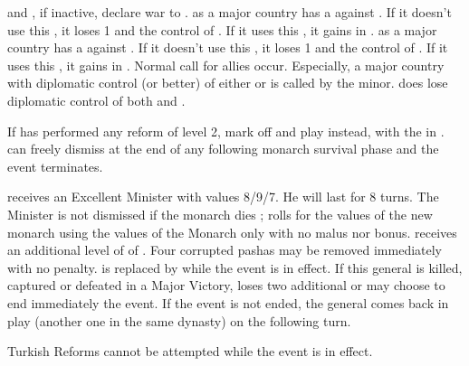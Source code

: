 

\phevnt
\aparag \DANMin and \PRUmin, if inactive, declare war to \SUE.
\aparag \PRU as a major country has a \CB against \SUE. If it doesn't use this
\CB, it loses 1 \STAB and the control of \paysDanemark. If it uses this \CB,
it gains \paysDanemark in \EG.
\aparag \DAN as a major country has a \CB against \SUE. If it doesn't use this
\CB, it loses 1 \STAB and the control of \PRUmin. If it uses this \CB, it
gains \PRUmin in \EG.
\aparag Normal call for allies occur. Especially, a major country with
diplomatic control (\AM or better) of either \DANmin or \PRUmin is called by
the minor.
\aparag \SUE does lose diplomatic control of both \paysDanemark and
\paysBrandebourg.





\aparag If \TUR has performed any reform of level 2, mark off and play \RD
instead, with the \REVOLT in \TUR.
\aparag \TUR can freely dismiss  at the end of any
following monarch survival phase and the event terminates.

\phevnt
\aparag \TUR receives an Excellent Minister \ministreKoprulu with values
8/9/7. He will last for 8 turns.
The Minister is not dismissed if the \TUR monarch dies ; \TUR rolls for the
values of the new monarch using the values of the Monarch only with no malus
nor bonus.
\aparag \TUR receives an additional level of \MNU of .
\aparag Four corrupted pashas may be removed immediately with no penalty.
\aparag {} is replaced by \leaderKoprulu while the event is
in effect. If this general is killed, captured or defeated in a Major Victory,
\TUR loses two additional \STAB or may choose to end immediately the event. If
the event is not ended, the general comes back in play (another one in the
same dynasty) on the following turn.

\phadm
\aparag Turkish Reforms cannot be attempted while the event is in effect.




